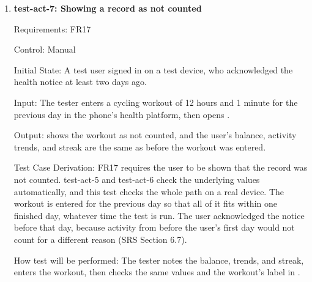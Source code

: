 \documentclass[12pt, titlepage]{article}
\begin{document}
\begin{enumerate}
Input: A cycling record on day $d$ lasting exactly 12 hours, and a cycling
record on day $d+1$ lasting 12 hours and 1 minute.

Output: The app counts the first workout, giving a cycling total of 720
minutes for day $d$. It leaves the second workout out, giving a cycling total
of 0 for day $d+1$, and marks it as not counted.

Test Case Derivation: \texttt{MAX\_WORKOUT\_DURATION} is 12 hours, and FR17
leaves out only a workout longer than it, so the two records check the limit
at its value and one minute above it. They are on separate days because two
workouts this long cannot fit in one day. Checking a single workout's length
needs its start and end times, which only the phone stores, so the app applies
this limit before it sends the daily total.

How test will be performed: A Jest test passes the records to the app's code
that builds daily totals, and checks the total and each record's status.

\item{\textbf{test-act-7: Showing a record as not counted}\\}

Requirements: FR17

Control: Manual

Initial State: A test user signed in on a test device, who acknowledged the
health notice at least two days ago.

Input: The tester enters a cycling workout of 12 hours and 1 minute for the
previous day in the phone's health platform, then opens \progname{}.

Output: \progname{} shows the workout as not counted, and the user's balance,
activity trends, and streak are the same as before the workout was entered.

Test Case Derivation: FR17 requires the user to be shown that the record was
not counted. test-act-5 and test-act-6 check the underlying values
automatically, and this test checks the whole path on a real device. The
workout is entered for the previous day so that all of it fits within one
finished day, whatever time the test is run. The user acknowledged the notice
before that day, because activity from before the user's first day would not
count for a different reason (SRS Section 6.7).

How test will be performed: The tester notes the balance, trends, and streak,
enters the workout, then checks the same values and the workout's label in
\progname{}.


\end{enumerate}
\end{document}
